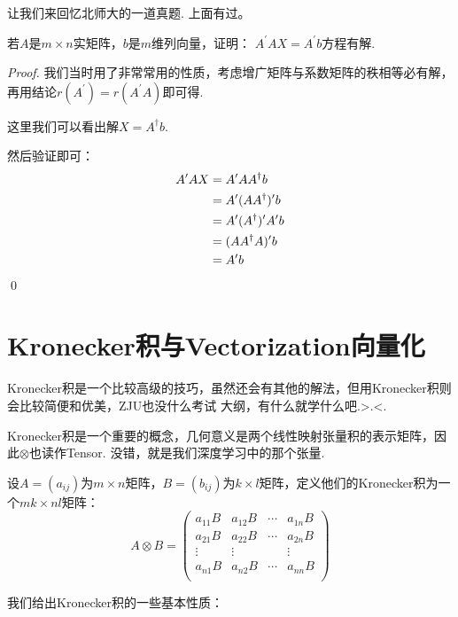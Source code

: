 让我们来回忆北师大的一道真题. 上面有过。

\begin{ex}[北师大 2020]
	若$A$是$m \times n$实矩阵，$b$是$m$维列向量，证明： $A^\prime AX = A^\prime b$方程有解.
\end{ex}

\begin{proof}
	我们当时用了非常常用的性质，考虑增广矩阵与系数矩阵的秩相等必有解，再用结论$r(A^\prime) = r(A^\prime A)$即可得.

	这里我们可以看出解$X=A^\dagger b$.

	然后验证即可：
	\begin{align*}
		A^{\prime} A X &= A^{\prime} A A^\dagger b \\
		&= A^{\prime} (A A^\dagger)^\prime b \\
		&= A^{\prime} (A^{\dagger})^{\prime} A^{\prime} b\\
		&= (A A^\dagger A)^{\prime} b \\
		&= A^\prime b 
	\end{align*}
	\qed{}
\end{proof}

\section*{Kronecker积与Vectorization向量化}

Kronecker积是一个比较高级的技巧，虽然还会有其他的解法，但用Kronecker积则会比较简便和优美，ZJU也没什么考试
大纲，有什么就学什么吧.>.<. 

Kronecker积是一个重要的概念，几何意义是两个线性映射张量积的表示矩阵，因此$\otimes$也读作Tensor.
没错，就是我们深度学习中的那个张量.

\begin{definition}
	设$A=(a_{ij})$为$m \times n$矩阵，$B=(b_{ij})$为$k\times l$矩阵，定义他们的Kronecker积为一个$mk \times nl$矩阵：
	$$
	A \otimes B =  
	\begin{pmatrix}
		a_{11}B & a_{12}B & \cdots & a_{1n}B \\
		a_{21}B & a_{22}B & \cdots & a_{2n}B \\
		\vdots  & \vdots & & \vdots \\
		a_{n1}B & a_{n2}B & \cdots & a_{nn}B \\
	\end{pmatrix}
	$$ 
\end{definition}

我们给出Kronecker积的一些基本性质：

